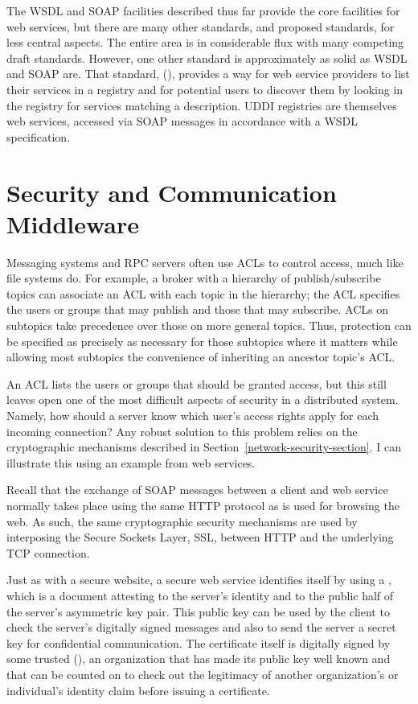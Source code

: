 The WSDL and SOAP facilities described thus far provide the core
facilities for web services, but there are many other standards, and
proposed standards, for less central aspects.  The entire area is in
considerable flux with many competing draft standards.
However, one other standard is approximately as solid as
WSDL and SOAP are.  That standard,  (), provides a way for web service
providers to list their services in a registry and for potential
users to discover them by looking in the registry for services
matching a description.  UDDI registries are themselves web services,
accessed via SOAP messages in accordance with a WSDL specification.

\section{Security and Communication
  Middleware}\label{distmid-security-section}

Messaging systems and RPC servers often use ACLs to control access,
much like file systems do.  For example, a broker with a hierarchy of
publish/subscribe topics can associate
an ACL with each topic in the hierarchy; the ACL specifies the users or groups that may publish and
those that may subscribe.  ACLs on subtopics take
precedence over those on more general topics.  Thus, protection can be
specified as precisely as necessary for those subtopics where it
matters while allowing most subtopics the convenience of inheriting
an ancestor topic's ACL.

An ACL lists the users or groups that should be granted access, but
this still leaves open one of the most difficult aspects of security
in a distributed system.  Namely, how should a server know which
user's access rights apply for each incoming connection?  Any robust
solution to this problem relies on the cryptographic mechanisms
described in Section~\ref{network-security-section}.  I can illustrate
this using an example from web services.

Recall that the exchange of SOAP messages between a client and web
service normally takes place using the same HTTP protocol as is used
for browsing the web.  As such, the same cryptographic security
mechanisms are used by interposing the Secure Sockets Layer, SSL,
between HTTP and the underlying TCP connection.

Just as with a secure website, a secure web service identifies itself
by using a , which is a document attesting to the
server's identity and to the public half of the server's asymmetric
key pair.  This public key can be used by the client to check the
server's digitally signed
messages and also to send the server a secret key for
confidential communication.  The certificate itself is digitally
signed by some trusted  (),
an organization that has made its public key well known and that can be
counted on to check out the legitimacy of another organization's or
individual's identity claim before issuing a certificate.

